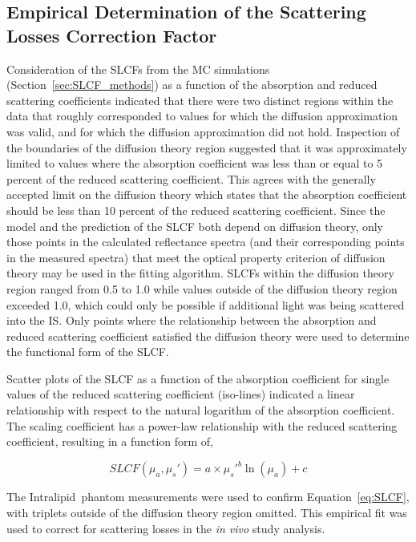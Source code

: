 \subsection{Empirical Determination of the Scattering Losses Correction Factor}
Consideration of the SLCFs from the MC simulations (Section~\ref{sec:SLCF_methods}) as a function of the absorption and reduced scattering coefficients indicated that there were two distinct regions within the data that roughly corresponded to values for which the diffusion approximation was valid, and for which the diffusion approximation did not hold. Inspection of the boundaries of the diffusion theory region suggested that it was approximately limited to values where the absorption coefficient was less than or equal to 5 percent of the reduced scattering coefficient. This agrees with the generally accepted limit on the diffusion theory which states that the absorption coefficient should be less than 10 percent of the reduced scattering coefficient. Since the model and the prediction of the SLCF both depend on diffusion theory, only those points in the calculated reflectance spectra (and their corresponding points in the measured spectra) that meet the optical property criterion of diffusion theory may be used in the fitting algorithm. SLCFs within the diffusion theory region ranged from 0.5 to 1.0 while values outside of the diffusion theory region exceeded 1.0, which could only be possible if additional light was being scattered into the IS. Only points where the relationship between the absorption and reduced scattering coefficient satisfied the diffusion theory were used to determine the functional form of the SLCF.

Scatter plots of the SLCF as a function of the absorption coefficient for single values of the reduced scattering coefficient (iso-lines) indicated a linear relationship with respect to the natural logarithm of the absorption coefficient. The scaling coefficient has a power-law relationship with the reduced scattering coefficient, resulting in a function form of,

\begin{equation}
\label{eq:SLCF}
	SLCF(\mu_a,\mu_s') = a \times \mu_s'^b \ln(\mu_a) + c
\end{equation}

The Intralipid\textregistered~phantom measurements were used to confirm Equation~\ref{eq:SLCF}, with triplets outside of the diffusion theory region omitted. This empirical fit was used to correct for scattering losses in the \emph{in vivo} study analysis.

